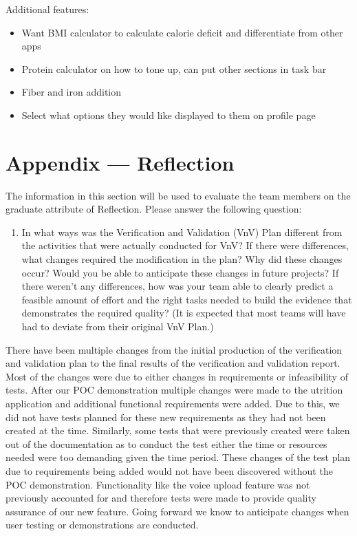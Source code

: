 \documentclass[12pt, titlepage]{article}
\begin{document}
	Additional features:
	\begin{itemize}
		\item Want BMI calculator to calculate calorie deficit and differentiate from other apps
		\item Protein calculator on how to tone up, can put other sections in task bar
		\item Fiber and iron addition
		\item Select what options they would like displayed to them on profile page
	\end{itemize}
	
	
	
	
	\newpage{}
	\section*{Appendix --- Reflection}
	
	The information in this section will be used to evaluate the team members 
	on the
	graduate attribute of Reflection.  Please answer the following question:
	
	\begin{enumerate}
		\item In what ways was the Verification and Validation (VnV) Plan 
		different
		from the activities that were actually conducted for VnV?  If there were
		differences, what changes required the modification in the plan?  Why 
		did
		these changes occur?  Would you be able to anticipate these changes in 
		future
		projects?  If there weren't any differences, how was your team able to 
		clearly
		predict a feasible amount of effort and the right tasks needed to build 
		the
		evidence that demonstrates the required quality?  (It is expected that 
		most
		teams will have had to deviate from their original VnV Plan.)
	\end{enumerate}
	There have been multiple changes from the initial production of the verification and validation plan to the final results of the verification and validation report. Most of the changes were due to either changes in requirements or infeasibility of tests.  After our POC demonstration multiple changes were made to the utrition application and additional functional requirements were added. Due to this, we did not have tests planned for these new requirements as they had not been created at the time. Similarly, some tests that were previously created were taken out of the documentation as to conduct the test either the time or resources needed were too demanding given the time period. These changes of the test plan due to requirements being added would not have been discovered without the POC demonstration. Functionality like the voice upload feature was not previously accounted for and therefore tests were made to provide quality assurance of our new feature. Going forward we know to anticipate changes when user testing or demonstrations are conducted. 

	
\end{document}
